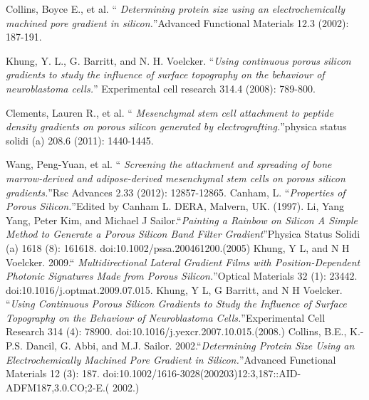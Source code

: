 \documentclass{article}
\begin{document}
\begin{thebibliography}{XX}
Collins, Boyce E., et al. \textquotedblleft \emph{
    Determining protein size using an electrochemically machined
    pore gradient in silicon.}\textquotedblright Advanced Functional
  Materials 12.3 (2002): 187-191.

 Khung, Y. L., G. Barritt, and
  N. H. Voelcker. \textquotedblleft \emph{Using continuous porous
    silicon gradients to study the influence of surface topography
    on the behaviour of neuroblastoma cells.}\textquotedblright
  Experimental cell research 314.4 (2008): 789-800.

 Clements, Lauren R., et al. \textquotedblleft
  \emph{Mesenchymal stem cell attachment to peptide density
    gradients on porous silicon generated by
    electrografting.}\textquotedblright physica status solidi (a)
  208.6 (2011): 1440-1445.

 Wang, Peng-Yuan, et al. \textquotedblleft
  \emph{Screening the attachment and spreading of bone
    marrow-derived and adipose-derived mesenchymal stem cells on
    porous silicon gradients.}\textquotedblright Rsc Advances 2.33
  (2012): 12857-12865.
 Canham, L. \textquotedblleft \emph{Properties of
    Porous Silicon.}\textquotedblright Edited by Canham L. DERA,
  Malvern, UK. (1997).
 Li, Yang Yang, Peter Kim, and Michael J
  Sailor.\textquotedblleft \emph{Painting a Rainbow on Silicon A
    Simple Method to Generate a Porous Silicon Band Filter
    Gradient}\textquotedblright Physica Status Solidi (a) 1618 (8):
  161618. doi:10.1002/pssa.200461200.(2005)
 Khung, Y L, and N H
  Voelcker. 2009.\textquotedblleft\emph{ Multidirectional Lateral
    Gradient Films with Position-Dependent Photonic Signatures Made
    from Porous Silicon.}\textquotedblright Optical Materials 32
  (1): 23442. doi:10.1016/j.optmat.2009.07.015.
  Khung, Y L, G Barritt, and N H Voelcker.
  \textquotedblleft \emph{Using Continuous Porous Silicon Gradients
    to Study the Influence of Surface Topography on the Behaviour of
    Neuroblastoma Cells.}\textquotedblright Experimental Cell
  Research 314 (4): 78900. doi:10.1016/j.yexcr.2007.10.015.(2008.)
 Collins, B.E., K.-P.S. Dancil, G. Abbi, and
  M.J. Sailor. 2002.\textquotedblleft \emph{Determining Protein Size
    Using an Electrochemically Machined Pore Gradient in
    Silicon.}\textquotedblright Advanced Functional Materials 12 (3):
  187. doi:10.1002/1616-3028(200203)12:3,187::AID-ADFM187,3.0.CO;2-E.(
  2002.)


\end{thebibliography}
\end{document}
